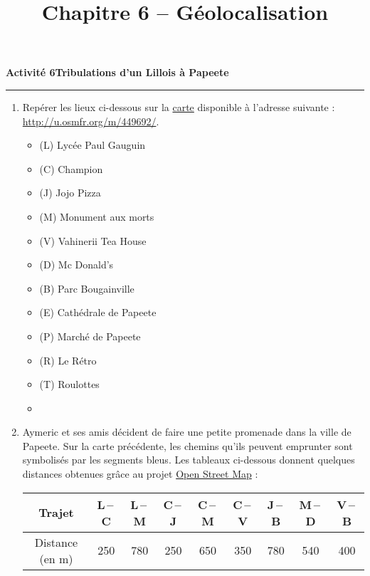 \documentclass[a4paper]{article}
\begin{document}
\title{Chapitre 6 -- Géolocalisation}

\pagestyle{empty}

\date{}
\author{}

\maketitle{}

\thispagestyle{empty}
\noindent\textbf{Activité 6}\hfill{}\textbf{Tribulations d'un Lillois à Papeete}
\smallskip
\hrule
\medskip


\begin{enumerate}
  \item Repérer les lieux ci-dessous sur la \href{http://u.osmfr.org/m/449692/}{carte} disponible à l'adresse suivante : \url{http://u.osmfr.org/m/449692/}.
    \begin{multicols}{3}
      \begin{itemize}
	\item (L) Lycée Paul Gauguin
	\item (C) Champion
	\item (J) Jojo Pizza
	\item (M) Monument aux morts
	\item (V) Vahinerii Tea House
	\item (D) Mc Donald's
	\item (B) Parc Bougainville
	\item (E) Cathédrale de Papeete
	\item (P) Marché de Papeete
	\item (R) Le Rétro
	\item (T) Roulottes
	\item[]
      \end{itemize} 
    \end{multicols}
  \item Aymeric et ses amis décident de faire une petite promenade dans la ville de Papeete. Sur la carte précédente, les chemins qu'ils peuvent emprunter sont symbolisés par les segments bleus. Les tableaux ci-dessous donnent quelques distances obtenues grâce au projet \href{https://www.openstreetmap.org/}{Open Street Map} :

    \medskip

    \begin{center}
      \begin{tabular}{@{}ccccccccc@{}}
	\toprule
	Trajet & L\,--\,C & L\,--\,M & C\,--\,J & C\,--\,M & C\,--\,V & J\,--\,B & M\,--\,D & V\,--\,B\\
	\midrule
	Distance (en m) & 250 & 780 & 250 & 650 & 350 & 780 & 540 & 400\\ 
	\bottomrule
      \end{tabular}
    \end{center}


\end{enumerate}
\end{document}

